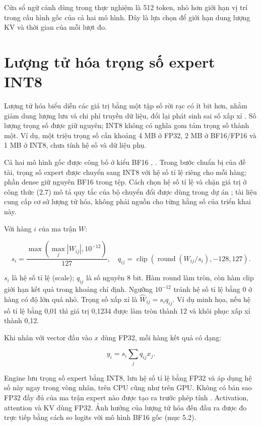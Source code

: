Cửa sổ ngữ cảnh dùng trong thực nghiệm là 512 token, nhỏ hơn giới hạn vị trí trong cấu hình gốc của cả hai mô hình. Đây là lựa chọn để giới hạn dung lượng KV và thời gian của mỗi lượt đo.

\section{Lượng tử hóa trọng số expert INT8}

Lượng tử hóa biểu diễn các giá trị bằng một tập số rời rạc có ít bit hơn, nhằm giảm dung lượng lưu và chi phí truyền dữ liệu, đổi lại phát sinh sai số xấp xỉ \cite{quantization_survey}. Số lượng trọng số được giữ nguyên; INT8 không có nghĩa gom tám trọng số thành một. Ví dụ, một triệu trọng số cần khoảng 4 MB ở FP32, 2 MB ở BF16/FP16 và 1 MB ở INT8, chưa tính hệ số và dữ liệu phụ.

Cả hai mô hình gốc được công bố ở kiểu BF16 \cite{olmoe_0924_config}, \cite{qwen3_config}. Trong bước chuẩn bị của đề tài, trọng số expert được chuyển sang INT8 với hệ số tỉ lệ riêng cho mỗi hàng; phần dense giữ nguyên BF16 trong tệp. Cách chọn hệ số tỉ lệ và chặn giá trị ở công thức (2.7) mô tả quy tắc của bộ chuyển đổi được dùng trong dự án \cite{moe_tierengine_arch}; tài liệu \cite{quantization_survey} cung cấp cơ sở lượng tử hóa, không phải nguồn cho từng hằng số của triển khai này.

Với hàng $i$ của ma trận $W$:

\begin{equation}
\label{eq:2.7}
s_i=\frac{\max(\max_j|W_{ij}|,10^{-12})}{127},\quad q_{ij}=\operatorname{clip}\left(\operatorname{round}(W_{ij}/s_i),-128,127\right).
\end{equation}

$s_i$ là hệ số tỉ lệ (scale); $q_{ij}$ là số nguyên 8 bit. Hàm round làm tròn, còn hàm clip giới hạn kết quả trong khoảng chỉ định. Ngưỡng $10^{-12}$ tránh hệ số tỉ lệ bằng 0 ở hàng có độ lớn quá nhỏ. Trọng số xấp xỉ là $\widehat W_{ij}=s_iq_{ij}$. Ví dụ minh họa, nếu hệ số tỉ lệ bằng 0,01 thì giá trị 0,1234 được làm tròn thành 12 và khôi phục xấp xỉ thành 0,12.

Khi nhân với vector đầu vào $x$ dùng FP32, mỗi hàng kết quả có dạng:

\begin{equation}
\label{eq:2.8}
y_i=s_i\sum_jq_{ij}x_j.
\end{equation}

Engine lưu trọng số expert bằng INT8, lưu hệ số tỉ lệ bằng FP32 và áp dụng hệ số này ngay trong vòng nhân, trên CPU cũng như trên GPU. Không có bản sao FP32 đầy đủ của ma trận expert nào được tạo ra trước phép tính \cite{moe_tierengine_arch}. Activation, attention và KV dùng FP32. Ảnh hưởng của lượng tử hóa đến đầu ra được đo trực tiếp bằng cách so logits với mô hình BF16 gốc (mục 5.2).

